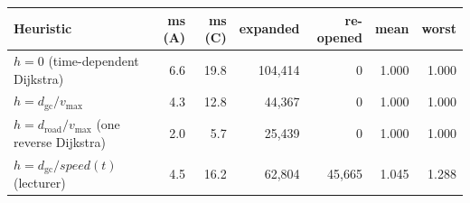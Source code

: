 \begin{tabular}{l rrrrr r}
\toprule
Heuristic & ms (A) & ms (C) & expanded & re-opened & mean & worst \\
\midrule
$h = 0$ (time-dependent Dijkstra) & 6.6 & 19.8 & 104{,}414 & 0 & 1.000 & 1.000 \\
$h = d_{\mathrm{gc}} / v_{\max}$ & 4.3 & 12.8 & 44{,}367 & 0 & 1.000 & 1.000 \\
$h = d_{\mathrm{road}} / v_{\max}$ (one reverse Dijkstra) & 2.0 & 5.7 & 25{,}439 & 0 & 1.000 & 1.000 \\
$h = d_{\mathrm{gc}} / \mathit{speed}(t)$ (lecturer) & 4.5 & 16.2 & 62{,}804 & 45{,}665 & 1.045 & 1.288 \\
\bottomrule
\end{tabular}
